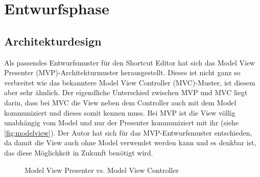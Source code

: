 \section{Entwurfsphase}

\subsection{Architekturdesign}

Als passendes Entwurfsmuster für den Shortcut Editor hat sich das Model View Presenter (MVP)-Architekturmuster herausgestellt. Dieses ist nicht ganz so verbreitet wie das bekanntere Model View Controller (MVC)-Muster, ist diesem aber sehr ähnlich. Der eigendliche Unterschied zwischen MVP und MVC liegt darin, dass bei MVC die View neben dem Controller auch mit dem Model kommuniziert und dieses somit kennen muss. Bei MVP ist die View völlig unabhängig vom Model und nur der Presenter kommuniziert mit ihr (siehe \autoref{fig:modelview}). Der Autor hat sich für das MVP-Entwurfsmuster entschieden, da damit die View auch ohne Model verwendet werden kann und es denkbar ist, das diese Möglichkeit in Zukunft benötigt wird.

\begin{figure}[H] 
	\hfill 
	\caption{Model View Presenter vs. Model View Controller} 
	\label{fig:modelview}
\end{figure}

